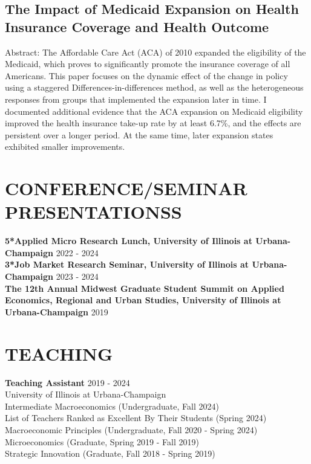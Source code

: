 \documentclass[a4paper,9pt]{extarticle}
\begin{document}
\subsection*{The Impact of Medicaid Expansion on Health Insurance Coverage and Health Outcome}
Abstract: The Affordable Care Act (ACA) of 2010 expanded the eligibility of the Medicaid, which proves to significantly promote the insurance coverage of all Americans. This paper focuses on the dynamic effect of the change in policy using a staggered Differences-in-differences method, as well as the heterogeneous responses from groups that implemented the expansion later in time. I documented additional evidence that the ACA expansion on Medicaid eligibility improved the health insurance take-up rate by at least 6.7\%, and the effects are persistent over a longer period. At the same time, later expansion states exhibited smaller improvements.

\section*{CONFERENCE/SEMINAR PRESENTATIONSS}

\noindent
\newline
\textbf{5*Applied Micro Research Lunch, University of Illinois at Urbana-Champaign} \hfill  2022 - 2024 \\
\textbf{3*Job Market Research Seminar, University of Illinois at Urbana-Champaign} \hfill  2023 - 2024 \\
\textbf{The 12th Annual Midwest Graduate Student Summit on Applied Economics, Regional and Urban Studies, University of Illinois at Urbana-Champaign} \hfill 2019 \\


\section*{TEACHING}

\noindent
\textbf{Teaching Assistant} \hfill 2019 - 2024 \\
University of Illinois at Urbana-Champaign \\
\newline
Intermediate Macroeconomics (Undergraduate, Fall 2024) \\
List of Teachers Ranked as Excellent By Their Students (Spring 2024) \\
Macroeconomic Principles (Undergraduate, Fall 2020 - Spring 2024) \\
\newline
Microeconomics (Graduate, Spring 2019 - Fall 2019) \\
Strategic Innovation (Graduate, Fall 2018 - Spring 2019) \\
\end{document}
